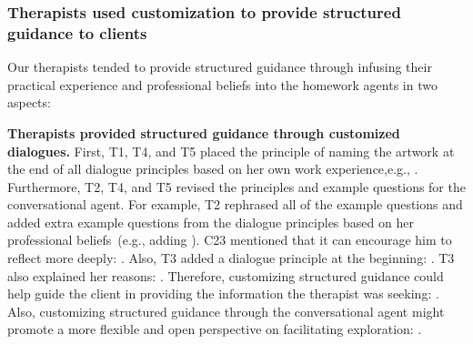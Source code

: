 \subsubsection{\textbf{Therapists used customization to provide structured guidance to clients}}
Our therapists tended to provide structured guidance through infusing their practical experience and professional beliefs into the homework agents in two aspects:


\textbf{Therapists provided structured guidance through customized dialogues.} 
First, T1, T4, and T5 placed the principle of naming the artwork at the end of all dialogue principles based on her own work experience,e.g., . 
Furthermore, T2, T4, and T5 revised the principles and example questions for the conversational agent. 
For example, T2 rephrased all of the example questions and added extra example questions from the dialogue principles based on her professional beliefs~(e.g., adding ). 
C23 mentioned that it can encourage him to reflect more deeply: .
Also, T3 added a dialogue principle at the beginning: . T3 also explained her reasons: .
Therefore, customizing structured guidance could help guide the client in providing the information the therapist was seeking: .
Also, customizing structured guidance through the conversational agent might promote a more flexible and open perspective on facilitating exploration: .

